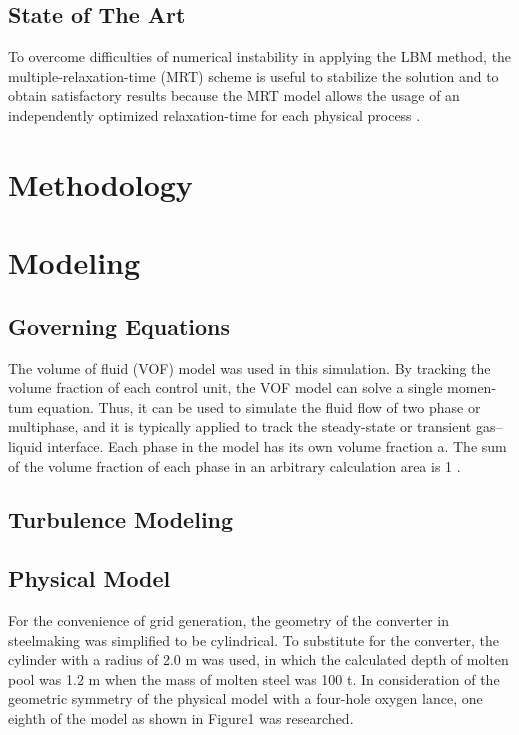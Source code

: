 \subsection{State of The Art}

To overcome difficulties of numerical instability in applying the LBM method, the multiple-relaxation-time (MRT) scheme is useful to stabilize the solution and to obtain satisfactory results because the MRT model allows the usage of an independently optimized relaxation-time for each physical process \cite{sugaD3Q27MultiplerelaxationtimeLattice2015}.

\section{Methodology}


\section{Modeling}

\subsection{Governing Equations}

The volume of fluid (VOF) model was used in this simulation. By tracking the volume fraction of each control unit, the VOF model can solve a single momen- tum equation. Thus, it can be used to simulate the fluid flow of two phase or multiphase, and it is typically applied to track the steady-state or transient gas–liquid interface.
Each phase in the model has its own volume fraction a. The sum of the volume fraction of each phase in an arbitrary calculation area is 1 \cite{lvSimulationFlowFluid2013}.

\subsection{Turbulence Modeling}

\subsection{Physical Model}
For the convenience of grid generation, the geometry of the converter in steelmaking was simplified to be cylindrical. To substitute for the converter, the cylinder with a radius of 2.0 m was used, in which the calculated depth of molten pool was 1.2 m when the mass of molten steel was 100 t.
In consideration of the geometric symmetry of the physical model with a four-hole oxygen lance, one eighth of the model as shown in Figure1 was researched.

